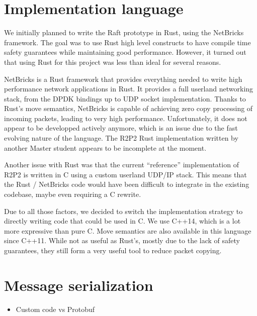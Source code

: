 \section{Implementation language}

We initially planned to write the Raft prototype in Rust, using the NetBricks\cite{netbricks} framework.
The goal was to use Rust high level constructs to have compile time safety guarantees while maintaining good performance.
However, it turned out that using Rust for this project was less than ideal for several reasons.

NetBricks\cite{netbricks} is a Rust framework that provides everything needed to write high performance network applications in Rust.  %
It provides a full userland networking stack, from the DPDK bindings up to UDP socket implementation.
Thanks to Rust's move semantics, NetBricks is capable of achieving zero copy processing of incoming packets, leading to very high performance.
Unfortunately, it does not appear to be developped actively anymore, which is an issue due to the fast evolving nature of the language.
The R2P2 Rust implementation\cite{ogier} written by another Master student appears to be incomplete at the moment.

Another issue with Rust was that the current ``reference'' implementation of R2P2 is written in C using a custom userland UDP/IP stack.
This means that the Rust / NetBricks code would have been difficult to integrate in the existing codebase, maybe even requiring a C rewrite.

Due to all those factors, we decided to switch the implementation strategy to directly writing code that could be used in C.
We use C++14, which is a lot more expressive than pure C.
Move semantics are also available in this language since C++11.
While not as useful as Rust's, mostly due to the lack of safety guarantees, they still form a very useful tool to reduce packet copying.

\section{Message serialization}


\begin{itemize}
    \item Custom code vs Protobuf
\end{itemize}

